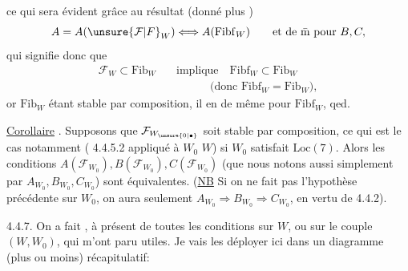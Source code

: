 
ce qui sera évident  grâce au résultat (donné plus )
\[
 A=A(\unsure{\mathcal{F}|F}_{W})\Longleftrightarrow A(\mathrm{Fibf}_{W})
 \qquad\text{et de \={m} pour }B,C,
\]
qui signifie donc que 
\[
 \begin{aligned}
 \mathcal{F}_{W}\subset\mathrm{Fib}_{W}&\quad\text{implique}\quad\mathrm{Fibf}_{W}\subset\mathrm{Fib}_{W}\\
 &\hspace{4em}\text{(donc }\mathrm{Fibf}_{W}=\mathrm{Fib}_{W}),
 \end{aligned}
\]
or $\mathrm{Fib}_{W}$ étant stable par composition, il en  de même pour $\mathrm{Fibf}_{W}$, qed.

\uline{Corollaire} . Supposons que $\mathcal{F}_{W_{\unsure{0|\bullet}}}$ soit stable par composition, ce qui est le cas notamment ( 4.4.5.2 appliqué à $W_0$  $W$) si $W_0$ satisfait $\mathrm{Loc}(7)$. Alors les conditions $A(\mathcal{F}_{W_0}),B(\mathcal{F}_{W_0}),C(\mathcal{F}_{W_0})$  (que nous notons aussi simplement par $A_{W_0},B_{W_0},C_{W_0}$) sont équivalentes. (\uline{NB} Si on ne fait pas l'hypothèse précédente sur $W_0$, on aura seulement $A_{W_0}\Longrightarrow B_{W_0}\Longrightarrow C_{W_0}$, en vertu de 4.4.2).

4.4.7. On a fait , à présent de toutes les conditions   sur $W$, ou sur le couple $(W,W_0)$, qui m'ont paru utiles. Je vais les déployer ici dans un diagramme (plus ou moins) récapitulatif:
